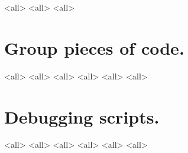 
\mode<all>{}
\mode<all>{}
\mode<all>{}

\section{Group pieces of code.}
\mode<all>{}
\mode<all>{}
\mode<all>{}
\mode<all>{}
\mode<all>{}
\mode<all>{}

\section{Debugging scripts.}
\mode<all>{}
\mode<all>{}
\mode<all>{}
\mode<all>{}
\mode<all>{}
\mode<all>{}



